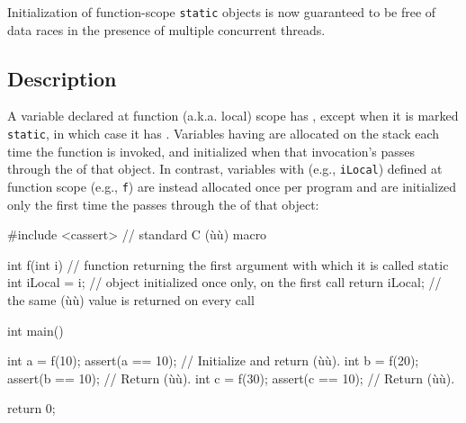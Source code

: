 



\setcounter{table}{0}
\setcounter{footnote}{0}
\setcounter{lstlisting}{0}


Initialization of function-scope \lstinline!static! objects is now guaranteed to be
free of data races in the presence
of multiple concurrent threads.

\subsection[Description]{Description}\label{description-functionstatic}

A variable declared at function (a.k.a. local) scope has ,
except when it is marked \lstinline!static!, in which case it has .
Variables having  are allocated on the stack
each time the function is invoked, and initialized when that invocation's 
passes through the  of that object.
In contrast, variables with  (e.g., \lstinline!iLocal!)
defined at function scope (e.g., \lstinline!f!) are instead allocated once per program and are initialized
only the first time the  passes
through the  of that object:

\begin{emcppslisting}
#include <cassert>  // standard C (ù{}ù) macro

int f(int i) // function returning the first argument with which it is called
{
    static int iLocal = i;  // object initialized once only, on the first call
    return iLocal;          // the same (ù{}ù) value is returned on every call
}

int main()
{
    int a = f(10);  assert(a == 10);  // Initialize and return (ù{}ù).
    int b = f(20);  assert(b == 10);  // Return (ù{}ù).
    int c = f(30);  assert(c == 10);  // Return (ù{}ù).

    return 0;
}
\end{emcppslisting}

